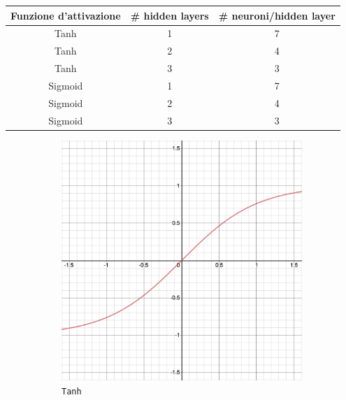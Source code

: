 \documentclass[12pt,a4paper,final]{book}
\begin{document}
\begin{center}
	\begin{tabular}{||c | c | c||}
	\hline
	Funzione d'attivazione & \# hidden layers & \# neuroni/hidden layer \\
	\hline\hline
	Tanh & 1 & 7 \\
	\hline
	Tanh & 2 & 4 \\
	\hline
	Tanh & 3 & 3 \\
	\hline
	Sigmoid & 1 & 7 \\
	\hline
	Sigmoid & 2 & 4 \\
	\hline
	Sigmoid & 3 & 3 \\
	\hline
	\end{tabular}
	\label{architetture}
\end{center}


\begin{figure}[!ht]
\centering
	\begin{subfigure}{0.45\textwidth}
	    \centering
	    \includegraphics[width=\linewidth]{../figures/tanh.png}
	    \caption{\texttt{Tanh}}
	    \label{tanh}
	\end{subfigure}
	\begin{subfigure}{0.45\textwidth}
		\centering

\end{subfigure}
\end{figure}
\end{document}
